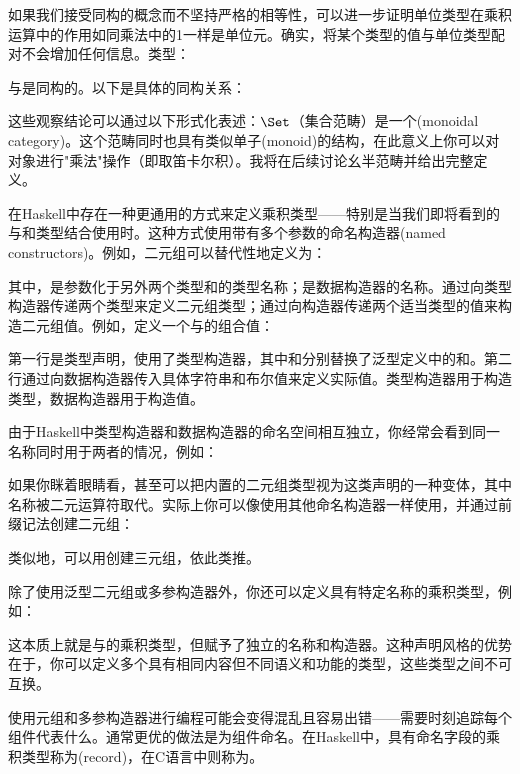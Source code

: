 如果我们接受同构的概念而不坚持严格的相等性，可以进一步证明单位类型\code{()}在乘积运算中的作用如同乘法中的1一样是单位元。确实，将某个类型的值与单位类型配对不会增加任何信息。类型：

与是同构的。以下是具体的同构关系：


这些观察结论可以通过以下形式化表述：$\Set$（集合范畴）是一个(monoidal category)。这个范畴同时也具有类似单子(monoid)的结构，在此意义上你可以对对象进行"乘法"操作（即取笛卡尔积）。我将在后续讨论幺半范畴并给出完整定义。

在Haskell中存在一种更通用的方式来定义乘积类型——特别是当我们即将看到的与和类型结合使用时。这种方式使用带有多个参数的命名构造器(named constructors)。例如，二元组可以替代性地定义为：

其中，是参数化于另外两个类型和的类型名称；是数据构造器的名称。通过向类型构造器传递两个类型来定义二元组类型；通过向构造器传递两个适当类型的值来构造二元组值。例如，定义一个与的组合值：

第一行是类型声明，使用了类型构造器，其中和分别替换了泛型定义中的和。第二行通过向数据构造器传入具体字符串和布尔值来定义实际值。类型构造器用于构造类型，数据构造器用于构造值。

由于Haskell中类型构造器和数据构造器的命名空间相互独立，你经常会看到同一名称同时用于两者的情况，例如：

如果你眯着眼睛看，甚至可以把内置的二元组类型视为这类声明的一种变体，其中名称被二元运算符\code{(,)}取代。实际上你可以像使用其他命名构造器一样使用\code{(,)}，并通过前缀记法创建二元组：

类似地，可以用\code{(,,)}创建三元组，依此类推。

除了使用泛型二元组或多参构造器外，你还可以定义具有特定名称的乘积类型，例如：

这本质上就是与的乘积类型，但赋予了独立的名称和构造器。这种声明风格的优势在于，你可以定义多个具有相同内容但不同语义和功能的类型，这些类型之间不可互换。

使用元组和多参构造器进行编程可能会变得混乱且容易出错——需要时刻追踪每个组件代表什么。通常更优的做法是为组件命名。在Haskell中，具有命名字段的乘积类型称为(record)，在C语言中则称为。

